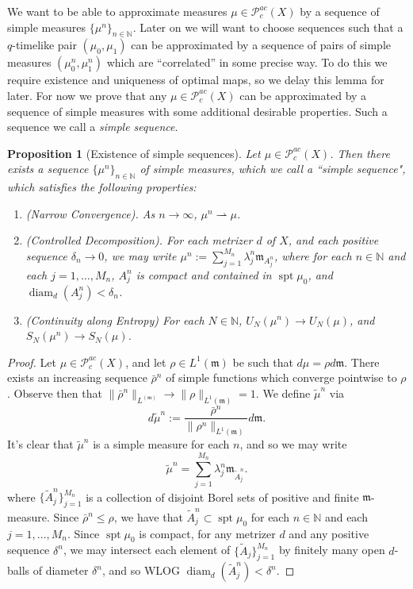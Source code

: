 \documentclass{article}
\newcommand{\N}{\mathbb{N}}
\newcommand{\m}{\mathfrak{m}}
\newcommand{\narrowto}{\rightharpoonup}
\DeclareMathOperator{\spt}{spt}
\DeclareMathOperator{\diam}{diam}
\newcommand{\Pcal}{\mathcal{P}}
\newtheorem{prop}[theorem]{Proposition}
\theoremstyle{definition}
\begin{document}
{We want to be able to approximate measures $\mu\in \Pcal_c^{ac}(X)$ by a sequence of simple measures $\{\mu^n\}_{n\in\N}$. Later on we will want to choose sequences such that a $q$-timelike pair $(\mu_0,\mu_1)$ can be approximated by a sequence of pairs of simple measures $(\mu_0^n, \mu_1^n)$ which are ``correlated'' in some precise way. To do this we require existence and uniqueness of optimal maps, so we delay this lemma for later. For now we prove that any $\mu\in \Pcal_c^{ac}(X)$ can be approximated by a sequence of simple measures with some additional desirable properties. Such a sequence we call a {\it simple sequence}. 
 
\begin{prop}[Existence of simple sequences]\label{simplesequence} Let $\mu\in \Pcal_c^{ac}(X)$. Then there exists a sequence $\{\mu^n\}_{n\in\N}$ of simple measures, which we call a ``simple sequence", which satisfies the following properties: 
\begin{enumerate}
\item (Narrow Convergence). As $n\to\infty$, $\mu^n\narrowto\mu$. 
\item (Controlled Decomposition). For each metrizer $d$ of $X$, and each positive sequence $\delta_n\to 0$, we may write $\mu^n:= \sum_{j=1}^{M_n}\lambda_j^n \m_{A_j^n}$, where for each $n\in\N$ and each $j=1,\dots, M_n$, $A_j^n$ is compact and contained in $\spt\mu_0$, and $\diam_d(A_j^n)<\delta_n$. 

\item (Continuity along Entropy) For each $N\in\N$, $U_N(\mu^n)\to U_N(\mu)$, and $S_N(\mu^n)\to S_N(\mu)$. 

\end{enumerate}
\end{prop}
\begin{proof}
Let $\mu\in \Pcal_c^{ac}(X)$, and let $\rho\in L^1(\m)$ be such that $d\mu=\rho d\m$. There exists an increasing sequence $\bar\rho^n$ of simple functions which converge pointwise to $\rho$. Observe then that $\|\bar\rho^n\|_{L^(\m)}\to \|\rho\|_{L^1(\m)}=1$. We define $\tilde\mu^n$ via
\[d\tilde \mu^n:=\frac{\bar\rho^n}{\|\rho^n\|_{L^1(\m)}}d\m.\]
It's clear that $\tilde\mu^n$ is a simple measure for each $n$, and so we may write
\[\tilde\mu^n= \sum_{j=1}^{M_n} \lambda_j^n \m_{\tilde A_j^n}. \]
where $\{\tilde A_j^n\}_{j=1}^{M_n}$ is a collection of disjoint Borel sets of positive and finite $\m$-measure. Since $\bar \rho^n\leq \rho$, we have that $\tilde A_j^n\subset \spt\mu_0$ for each $n\in\N$ and each $j=1,\dots, M_n$. Since $\spt\mu_0$ is compact, for any metrizer $d$ and any positive sequence $\delta^n$, we may intersect each element of $\{\tilde A_j\}_{j=1}^{M_n}$ by finitely many open $d$-balls of diameter $\delta^n$, and so WLOG $\diam_d(\tilde A_j^n)<\delta^n$. 



\end{proof}}
\end{document}
